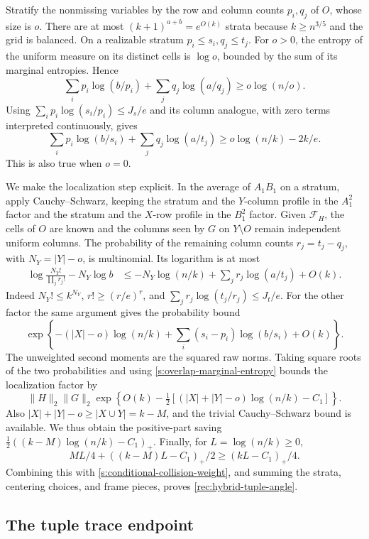 Stratify the nonmissing variables by the row and column counts
$p_i,q_j$ of $O$, whose size is $o$. There are at most
$(k+1)^{a+b}=e^{O(k)}$ strata because $k\ge n^{3/5}$ and the grid is
balanced. On a realizable stratum $p_i\le s_i,q_j\le t_j$.
For $o>0$, the entropy of the uniform measure on its distinct cells
is $\log o$, bounded by the sum of its marginal entropies. Hence
\[
 \sum_i p_i\log(b/p_i)+\sum_jq_j\log(a/q_j)
 \ge o\log(n/o).
\]
Using $\sum_i p_i\log(s_i/p_i)\le J_s/e$ and its column analogue,
with zero terms interpreted continuously, gives
\begin{equation}\label{s:overlap-marginal-entropy}
 \sum_i p_i\log(b/s_i)+\sum_jq_j\log(a/t_j)
 \ge o\log(n/k)-2k/e.
\end{equation}
This is also true when $o=0$.

We make the localization step explicit. In the average of $A_1B_1$
on a stratum, apply Cauchy--Schwarz, keeping the stratum and the
$Y$-column profile in the $A_1^2$ factor and the stratum and the
$X$-row profile in the $B_1^2$ factor. Given $\mathcal F_H$,
the cells of $O$ are known and the columns seen by $G$ on
$Y\setminus O$ remain independent uniform columns. The probability
of the remaining column counts $r_j=t_j-q_j$, with $N_Y=|Y|-o$, is
multinomial. Its logarithm is at most
\begin{align*}
 \log\frac{N_Y!}{\prod_jr_j!}-N_Y\log b
 &\le-N_Y\log(n/k)+\sum_jr_j\log(a/t_j)+O(k).
\end{align*}
Indeed $N_Y!\le k^{N_Y}$, $r!\ge(r/e)^r$, and
$\sum_jr_j\log(t_j/r_j)\le J_t/e$. For the other factor the same
argument gives the probability bound
\[
 \exp\left\{-(|X|-o)\log(n/k)
       +\sum_i(s_i-p_i)\log(b/s_i)+O(k)\right\}.
\]
The unweighted second moments are the squared raw norms. Taking
square roots of the two probabilities and using
\eqref{s:overlap-marginal-entropy} bounds the localization factor by
\[
 \|H\|_2\|G\|_2
 \exp\left\{O(k)-\tfrac12[(|X|+|Y|-o)\log(n/k)-C_1]\right\}.
\]
Also $|X|+|Y|-o\ge|X\cup Y|=k-M$, and the trivial
Cauchy--Schwarz bound is available. We thus obtain the positive-part
saving $\tfrac12((k-M)\log(n/k)-C_1)_+$.
Finally, for $L=\log(n/k)\ge0$,
\[
 ML/4+((k-M)L-C_1)_+/2\ge(kL-C_1)_+/4.
\]
Combining this with \eqref{s:conditional-collision-weight}, and summing
the strata, centering choices, and frame pieces, proves
\eqref{rec:hybrid-tuple-angle}.

\subsection{The tuple trace endpoint}

